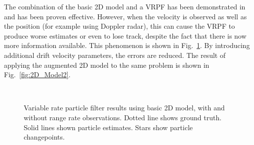 \documentclass[conference]{IEEEtran}
\begin{document}
The combination of the basic 2D model and a VRPF has been demonstrated in \cite{Godsill2007} and has been proven effective. However, when the velocity is observed as well as the position (for example using Doppler radar), this can cause the VRPF to produce worse estimates or even to lose track, despite the fact that there is now more information available. This phenomenon is shown in Fig.~\ref{fig:2D_Model1}. By introducing additional drift velocity parameters, the errors are reduced. The result of applying the augmented 2D model to the same problem is shown in Fig.~\ref{fig:2D_Model2}.
%
\begin{figure}[!t]
\centering
{}
\\
\caption{Variable rate particle filter results using basic 2D model, with and without range rate observations. Dotted line shows ground truth. Solid lines shown particle estimates. Stars show particle changepoints.}
\label{fig:2D_Model1}
\end{figure}
\end{document}
